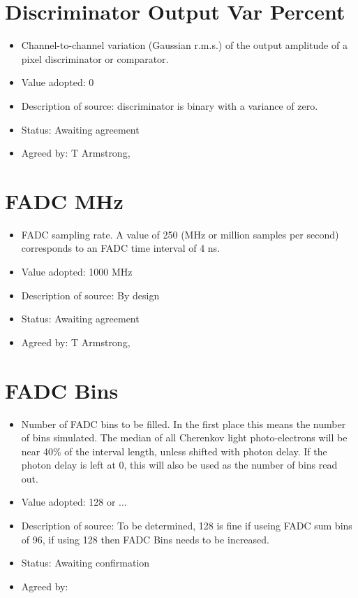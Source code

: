 \documentclass[GCT,short]{gct}
\begin{document}
\section{Discriminator Output Var Percent}
\begin{itemize}
\item Channel-to-channel variation (Gaussian r.m.s.) of the output amplitude of a pixel discriminator or comparator.
\item Value adopted: 0
\item Description of source: discriminator is binary with a variance of zero.
\item Status: \color{orange}Awaiting agreement\color{black}
\item Agreed by: T Armstrong, 
\end{itemize}

\section{FADC MHz}
\begin{itemize}
\item FADC sampling rate. A value of 250 (MHz or million samples per second) corresponds to an FADC time interval of 4 ns.
\item Value adopted: 1000 MHz
\item Description of source: By design
\item Status: \color{orange}Awaiting agreement \color{black}
\item Agreed by: T Armstrong, 
\end{itemize}

\section{FADC Bins }
\begin{itemize}
\item Number of FADC bins to be filled. In the first place this means the number of bins simulated. The median of all Cherenkov light photo-electrons will be near 40\% of the interval length, unless shifted with photon delay. If the photon delay is left at 0, this will also be used as the number of bins read out.
\item Value adopted: 128 or ...
\item Description of source: To be determined, 128 is fine if useing FADC sum bins of 96, if using 128 then FADC Bins needs to be increased.
\item Status: \color{orange}Awaiting confirmation \color{black}
\item Agreed by: 
\end{itemize}
\end{document}
